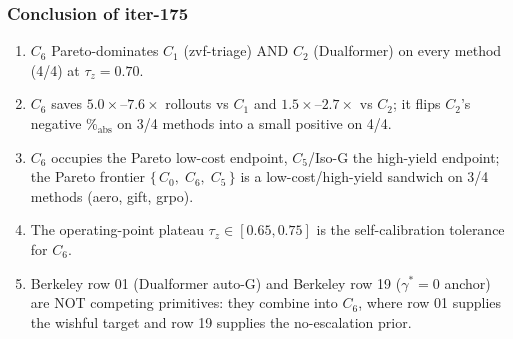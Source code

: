 \subsubsection*{Conclusion of iter-175}

\begin{enumerate}
\item $C_6$ Pareto-dominates $C_1$ (zvf-triage) AND $C_2$ (Dualformer)
      on every method (4/4) at $\tau_z = 0.70$.
\item $C_6$ saves $5.0\times$--$7.6\times$ rollouts vs $C_1$ and
      $1.5\times$--$2.7\times$ vs $C_2$; it flips $C_2$'s negative
      $\%_{\mathrm{abs}}$ on 3/4 methods into a small positive on 4/4.
\item $C_6$ occupies the Pareto low-cost endpoint, $C_5$/Iso-G the
      high-yield endpoint; the Pareto frontier $\{\,C_0,\; C_6,\; C_5\,\}$
      is a low-cost/high-yield sandwich on 3/4 methods (aero, gift, grpo).
\item The operating-point plateau $\tau_z \in [0.65, 0.75]$ is
      the self-calibration tolerance for $C_6$.
\item Berkeley row 01 (Dualformer auto-G) and Berkeley row 19
      ($\gamma^*{=}0$ anchor) are NOT competing primitives: they
      combine into $C_6$, where row 01 supplies the wishful target
      and row 19 supplies the no-escalation prior.
\end{enumerate}
